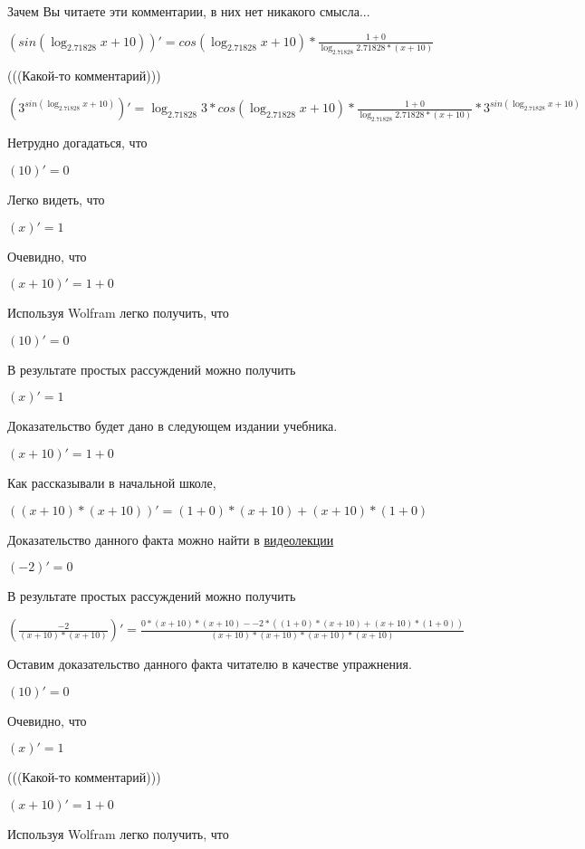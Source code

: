 \documentclass[12pt,a4paper,fleqn]{article}
\theoremstyle{definition}
\begin{document}
Зачем Вы читаете эти комментарии, в них нет никакого смысла...

$(sin(\log_{ 2.71828 }{ x  +  10 }))' = cos(\log_{ 2.71828 }{ x  +  10 }) * \frac{ 1  +  0 }{\log_{ 2.71828 }{ 2.71828 } * ( x  +  10 )}
$

(((Какой-то комментарий)))

$({ 3 }^{sin(\log_{ 2.71828 }{ x  +  10 })})' = \log_{ 2.71828 }{ 3 } * cos(\log_{ 2.71828 }{ x  +  10 }) * \frac{ 1  +  0 }{\log_{ 2.71828 }{ 2.71828 } * ( x  +  10 )}
 * { 3 }^{sin(\log_{ 2.71828 }{ x  +  10 })}$

Нетрудно догадаться, что

$( 10 )' =  0 $

Легко видеть, что

$( x )' =  1 $

Очевидно, что

$( x  +  10 )' =  1  +  0 $

Используя Wolfram легко получить, что

$( 10 )' =  0 $

В результате простых рассуждений можно получить

$( x )' =  1 $

Доказательство будет дано в следующем издании учебника.

$( x  +  10 )' =  1  +  0 $

Как рассказывали в начальной школе,

$(( x  +  10 ) * ( x  +  10 ))' = ( 1  +  0 ) * ( x  +  10 ) + ( x  +  10 ) * ( 1  +  0 )$

Доказательство данного факта можно найти в \href{https://www.youtube.com/watch?v=dQw4w9WgXcQ}{видеолекции}

$( -2 )' =  0 $

В результате простых рассуждений можно получить

$(\frac{ -2 }{( x  +  10 ) * ( x  +  10 )}
)' = \frac{ 0  * ( x  +  10 ) * ( x  +  10 ) -  -2  * (( 1  +  0 ) * ( x  +  10 ) + ( x  +  10 ) * ( 1  +  0 ))}{( x  +  10 ) * ( x  +  10 ) * ( x  +  10 ) * ( x  +  10 )}
$

Оставим доказательство данного факта читателю в качестве упражнения.

$( 10 )' =  0 $

Очевидно, что

$( x )' =  1 $

(((Какой-то комментарий)))

$( x  +  10 )' =  1  +  0 $

Используя Wolfram легко получить, что
\end{document}
